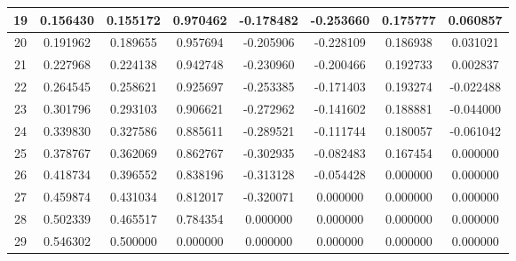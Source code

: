 \documentclass{article}
\begin{document}
\begin{table}[h!]
\begin{tabular}{|c|c|c|c|c|c|c|c|}
\hline
19&0.156430&0.155172&0.970462&-0.178482&-0.253660&0.175777&0.060857 \\ 
\hline
20&0.191962&0.189655&0.957694&-0.205906&-0.228109&0.186938&0.031021 \\ 
\hline
21&0.227968&0.224138&0.942748&-0.230960&-0.200466&0.192733&0.002837 \\ 
\hline
22&0.264545&0.258621&0.925697&-0.253385&-0.171403&0.193274&-0.022488 \\ 
\hline
23&0.301796&0.293103&0.906621&-0.272962&-0.141602&0.188881&-0.044000 \\ 
\hline
24&0.339830&0.327586&0.885611&-0.289521&-0.111744&0.180057&-0.061042 \\ 
\hline
25&0.378767&0.362069&0.862767&-0.302935&-0.082483&0.167454&0.000000 \\ 
\hline
26&0.418734&0.396552&0.838196&-0.313128&-0.054428&0.000000&0.000000 \\ 
\hline
27&0.459874&0.431034&0.812017&-0.320071&0.000000&0.000000&0.000000 \\ 
\hline
28&0.502339&0.465517&0.784354&0.000000&0.000000&0.000000&0.000000 \\ 
\hline
29&0.546302&0.500000&0.000000&0.000000&0.000000&0.000000&0.000000 \\ 
\hline
\end{tabular}
\end{table}
\end{document}
